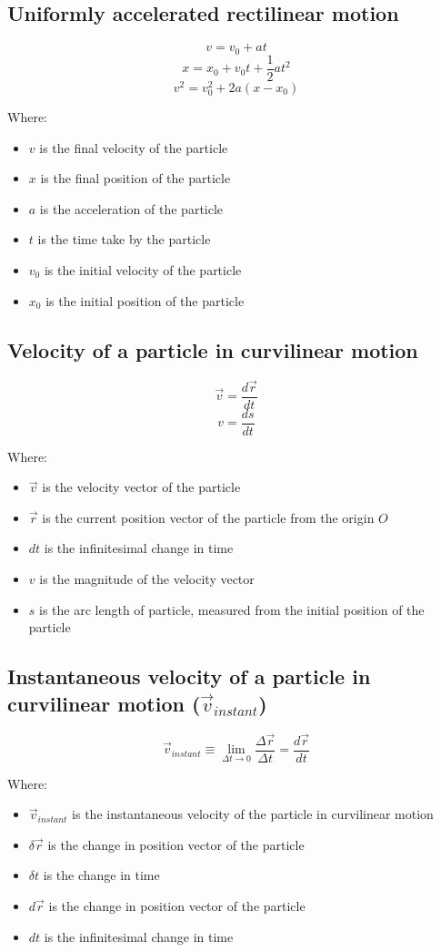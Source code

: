 \documentclass[11pt]{article}
\begin{document}
\subsection{Uniformly accelerated rectilinear motion}
\label{sec:org6763349}
\[v = v_0 + at\]
\[x = x_0 + v_0t + \frac{1}{2}at^2\]
\[v^2 = v_0^2 + 2a(x - x_0)\]

Where:
\begin{itemize}
\item \(v\) is the final velocity of the particle
\item \(x\) is the final position of the particle
\item \(a\) is the acceleration of the particle
\item \(t\) is the time take by the particle
\item \(v_0\) is the initial velocity of the particle
\item \(x_0\) is the initial position of the particle
\end{itemize}

\subsection{Velocity of a particle in curvilinear motion}
\label{sec:org5a7c2ee}
\[\vec{v} = \frac{d \vec{r}}{dt}\]
\[v = \frac{ds}{dt}\]

Where:
\begin{itemize}
\item \(\vec{v}\) is the velocity vector of the particle
\item \(\vec{r}\) is the current position vector of the particle from the origin \(O\)
\item \(dt\) is the infinitesimal change in time
\item \(v\) is the magnitude of the velocity vector
\item \(s\) is the arc length of particle, measured from the initial position of the particle
\end{itemize}

\subsection{Instantaneous velocity of a particle in curvilinear motion (\(\vec{v}_{instant}\))}
\label{sec:org03b99e1}
\[\vec{v}_{instant} \equiv \lim_{\Delta t \rightarrow 0} \frac{\Delta \vec{r}}{\Delta t} = \frac{d \vec{r}}{dt}\]

Where:
\begin{itemize}
\item \(\vec{v}_{instant}\) is the instantaneous velocity of the particle in curvilinear motion
\item \(\delta \vec{r}\) is the change in position vector of the particle
\item \(\delta t\) is the change in time
\item \(d \vec{r}\) is the change in position vector of the particle
\item \(dt\) is the infinitesimal change in time
\end{itemize}
\end{document}
